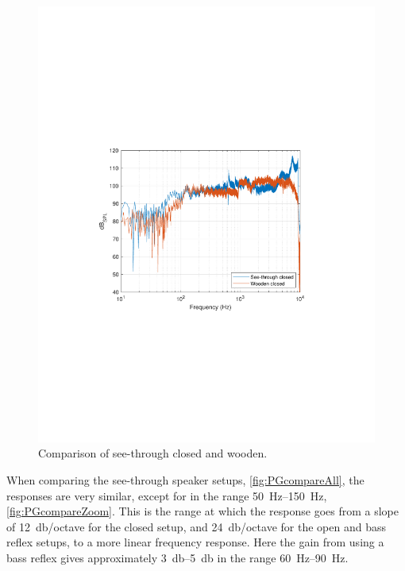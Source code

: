 \begin{figure}
	\centering
	\includegraphics[width=0.7\linewidth, clip, trim={3.9cm 8.4cm 4.5cm 9cm}]{gfx/SpeakerMeas/ClosedCompare.pdf}
	\caption{Comparison of see-through closed and wooden.}
	\label{fig:closedcompare}
\end{figure}

When comparing the see-through speaker setups, \cref{fig:PGcompareAll}, the responses are very similar, except for in the range \SIrange{50}{150}{\hertz}, \cref{fig:PGcompareZoom}.
This is the range at which the response goes from a slope of \SI{12}{\decibel}/octave for the closed setup, and \SI{24}{\decibel}/octave for the open and bass reflex setups, to a more linear frequency response.
Here the gain from using a bass reflex gives approximately \SIrange{3}{5}{\decibel} in the range \SIrange{60}{90}{\hertz}.

